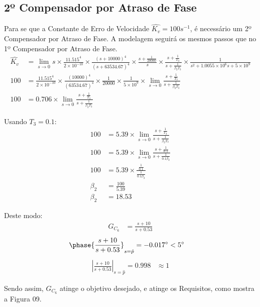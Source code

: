 \documentclass[a4paper]{article}
\begin{document}
 \subsection{2º Compensador por Atraso de Fase}
\par Para se que a Constante de Erro de Velocidade $\hat{K_v} = 100s^{-1}$, é necessário um 2º Compensador por Atraso de Fase. A modelagem seguirá os mesmos passos que no 1º Compensador por Atraso de Fase.
 \begin{align}
\hat{K_v}  &= \lim_{s \to 0} s\times\frac{11.515^4}{2\times10^{-10}}\times \frac{(s+10000)^4}{(s+63534.67)^4}\times\frac{s+\frac{1}{20000}}{s}\times\frac{s+\frac{1}{T_3}}{s+\frac{1}{\beta_2 T_3}}\times\frac{1}{s^2 + 1.0055\times10^{6}s+5\times10^9} \\
100 &= \frac{11.515^4}{2\times10^{-10}}\times \frac{(10000)^4}{(63534.67)^4}\times\frac{1}{20000}\times\frac{1}{5\times10^9} \times\lim_{s \to 0} \frac{s+\frac{1}{T_3}}{s+\frac{1}{\beta_2 T_3}}\\
100 &= 0.706\times\lim_{s \to 0} \frac{s+\frac{1}{T_3}}{s+\frac{1}{\beta_2 T_3}}
\end{align}
\vspace{0.5em}
\par Usando $T_3=0.1$:
  \begin{align}
 100 &= 5.39\times \lim_{s \to 0}\frac{s+\frac{1}{T_3}}{s+\frac{1}{\beta_2 T_3}} \\
 100 &= 5.39\times \lim_{s \to 0}\frac{s+\frac{1}{0.1}}{s+\frac{1}{0.1	\beta_2}} \\
 100 &= 5.39\times\frac{\frac{1}{0.1}}{\frac{1}{0.1\beta_2}}\\
 \beta_2 &= \frac{100}{5.39} \\
 \beta_2 &= 18.53
 \end{align}
 \par Deste modo:
  \begin{align}
 G_{C_6} &= \frac{s+10}{s+0.53}
 \end{align}
 \begin{align}
 \phase{\frac{s+10}{s+0.53}}_{s=\hat{p}} = \ang{-0.017} &< \ang{5}
 \end{align}
 \vspace{0.5em}
 \begin{align}
|\frac{s+10}{s+0.53}|_{s=\hat{p}} = 0.998 &\approx 1  
\end{align}
 \par Sendo assim, ${G_{C_6}}$ atinge o objetivo desejado, e atinge os Requisitos, como mostra a Figura 09. 
\end{document}
